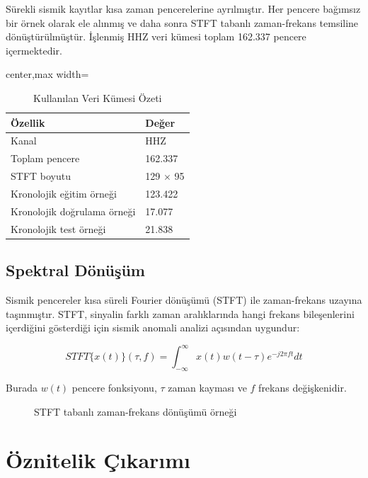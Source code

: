 Sürekli sismik kayıtlar kısa zaman pencerelerine ayrılmıştır. Her pencere bağımsız bir örnek olarak ele alınmış ve daha sonra STFT tabanlı zaman-frekans temsiline dönüştürülmüştür. İşlenmiş HHZ veri kümesi toplam 162.337 pencere içermektedir.

\begin{table}[htbp]
\centering
\small
\caption{Kullanılan Veri Kümesi Özeti}
\begin{adjustbox}{center,max width=\textwidth}
\begin{tabular}{ll}
\toprule
\textbf{Özellik} & \textbf{Değer} \\
\midrule
Kanal & HHZ \\
Toplam pencere & 162.337 \\
STFT boyutu & 129 $\times$ 95 \\
Kronolojik eğitim örneği & 123.422 \\
Kronolojik doğrulama örneği & 17.077 \\
Kronolojik test örneği & 21.838 \\
\bottomrule
\end{tabular}
\end{adjustbox}
\label{tab:veri_ozellikleri}
\end{table}

\subsection{Spektral Dönüşüm}

Sismik pencereler kısa süreli Fourier dönüşümü (STFT) ile zaman-frekans uzayına taşınmıştır. STFT, sinyalin farklı zaman aralıklarında hangi frekans bileşenlerini içerdiğini gösterdiği için sismik anomali analizi açısından uygundur:

\begin{equation}
STFT\{x(t)\}(\tau, f) = \int_{-\infty}^{\infty} x(t) w(t-\tau) e^{-j2\pi ft} dt
\end{equation}

Burada $w(t)$ pencere fonksiyonu, $\tau$ zaman kayması ve $f$ frekans değişkenidir.

\begin{figure}[htbp]
    \centering
    \caption{STFT tabanlı zaman-frekans dönüşümü örneği}
    \label{fig:stft_ornek}
\end{figure}

\section{Öznitelik Çıkarımı}

